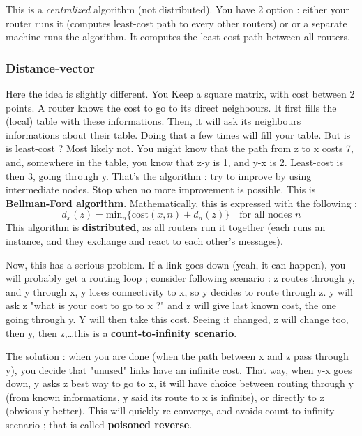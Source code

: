 \documentclass[12pt,a4paper]{article}
\begin{document}
This is a \textit{centralized} algorithm (not distributed). You have 2 option : either your router runs it (computes least-cost path to every other routers) or or a separate machine runs the algorithm. It computes the least cost path between all routers.

\subsubsection{Distance-vector}
Here the idea is slightly different. You Keep a square matrix, with cost between 2 points. A router knows the cost to go to its direct neighbours. It first fills the (local) table with these informations. Then, it will ask its neighbours informations about their table. Doing that a few times will fill your table. But is is least-cost ? Most likely not. You might know that the path from z to x costs 7, and, somewhere in the table, you know that z-y is 1, and y-x is 2. Least-cost is then 3, going through y. That's the algorithm : try to improve by using intermediate nodes. Stop when no more improvement is possible. This is \textbf{Bellman-Ford algorithm}. Mathematically, this is expressed with the following :
\begin{equation}
	d_x(z) = \text{min}_n \{\text{cost}(x,n) + d_n(z)\} \quad \text{for all nodes }n
	\label{eq: Bellman-Ford}
\end{equation}
This algorithm is \textbf{distributed}, as all routers run it together (each runs an instance, and they exchange and react to each other's messages).

Now, this has a serious problem. If a link goes down (yeah, it can happen), you will probably get a routing loop ; consider following scenario : z routes through y, and y through x, y loses connectivity to x, so y decides to route through z. y will ask z "what is your cost to go to x ?" and z will give last known cost, the one going through y. Y will then take this cost. Seeing it changed, z will change too, then y, then z,\ldots this is a \textbf{count-to-infinity scenario}.

The solution : when you are done (when the path between x and z pass through y), you decide that "unused" links have an infinite cost. That way, when y-x goes down, y asks z best way to go to x, it will have choice between routing through y (from known informations, y said its route to x is infinite), or directly to z (obviously better). This will quickly re-converge, and avoids count-to-infinity scenario ; that is called \textbf{poisoned reverse}.
\end{document}
